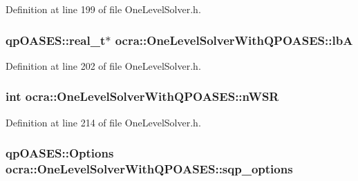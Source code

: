 Definition at line 199 of file One\+Level\+Solver.\+h.

\subsubsection[{\texorpdfstring{lbA}{lbA}}]{\setlength{\rightskip}{0pt plus 5cm}qp\+O\+A\+S\+E\+S\+::real\+\_\+t$\ast$ ocra\+::\+One\+Level\+Solver\+With\+Q\+P\+O\+A\+S\+E\+S\+::lbA\hspace{0.3cm}{\ttfamily [protected]}}\hypertarget{classocra_1_1OneLevelSolverWithQPOASES_a268dd33567d130672824404fdf98882a}{}\label{classocra_1_1OneLevelSolverWithQPOASES_a268dd33567d130672824404fdf98882a}


Definition at line 202 of file One\+Level\+Solver.\+h.

\subsubsection[{\texorpdfstring{n\+W\+SR}{nWSR}}]{\setlength{\rightskip}{0pt plus 5cm}int ocra\+::\+One\+Level\+Solver\+With\+Q\+P\+O\+A\+S\+E\+S\+::n\+W\+SR\hspace{0.3cm}{\ttfamily [protected]}}\hypertarget{classocra_1_1OneLevelSolverWithQPOASES_aa9c7ddcbafeff12cacea92ac658a63d6}{}\label{classocra_1_1OneLevelSolverWithQPOASES_aa9c7ddcbafeff12cacea92ac658a63d6}


Definition at line 214 of file One\+Level\+Solver.\+h.

\subsubsection[{\texorpdfstring{sqp\+\_\+options}{sqp_options}}]{\setlength{\rightskip}{0pt plus 5cm}qp\+O\+A\+S\+E\+S\+::\+Options ocra\+::\+One\+Level\+Solver\+With\+Q\+P\+O\+A\+S\+E\+S\+::sqp\+\_\+options\hspace{0.3cm}{\ttfamily [protected]}}\hypertarget{classocra_1_1OneLevelSolverWithQPOASES_ace333e6d7333a5bcd9c7be5bc7d98c7b}{}\label{classocra_1_1OneLevelSolverWithQPOASES_ace333e6d7333a5bcd9c7be5bc7d98c7b}


